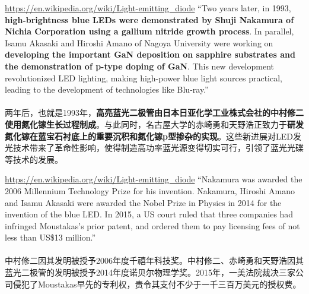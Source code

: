 \begin{slide}{\url{https://en.wikipedia.org/wiki/Light-emitting_diode}}
  ``Two years later, in 1993, \textbf{high-brightness blue LEDs were demonstrated by Shuji Nakamura of Nichia Corporation using a gallium nitride growth process}. In parallel, Isamu Akasaki and Hiroshi Amano of Nagoya University were working on \textbf{developing the important GaN deposition on sapphire substrates and the demonstration of p-type doping of GaN}. This new development revolutionized LED lighting, making high-power blue light sources practical, leading to the development of technologies like Blu-ray.''
  \\~\\
  两年后，也就是1993年，\textbf{高亮蓝光二极管由日本日亚化学工业株式会社的中村修二使用氮化镓生长过程制成}。与此同时，名古屋大学的赤崎勇和天野浩正致力于\textbf{研发氮化镓在蓝宝石衬底上的重要沉积和氮化镓p型掺杂的实现}。这些新进展对LED发光技术带来了革命性影响，使得制造高功率蓝光源变得切实可行，引领了蓝光光碟等技术的发展。
\end{slide}

\begin{slide}{\url{https://en.wikipedia.org/wiki/Light-emitting_diode}}
  ``Nakamura was awarded the 2006 Millennium Technology Prize for his invention. Nakamura, Hiroshi Amano and Isamu Akasaki were awarded the Nobel Prize in Physics in 2014 for the invention of the blue LED. In 2015, a US court ruled that three companies had infringed Moustakas's prior patent, and ordered them to pay licensing fees of not less than US\$13 million.''
  \\~\\
  中村修二因其发明被授予2006年度千禧年科技奖。中村修二、赤崎勇和天野浩因其蓝光二极管的发明被授予2014年度诺贝尔物理学奖。2015年，一美法院裁决三家公司侵犯了Moustakas早先的专利权，责令其支付不少于一千三百万美元的授权费。
\end{slide}

